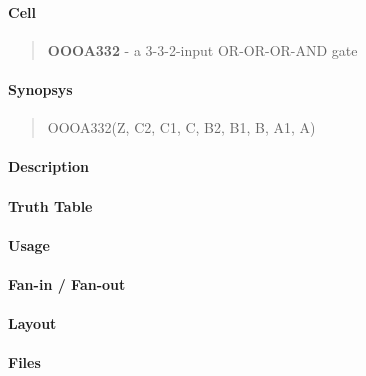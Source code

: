 \label{OOOA332}
\paragraph{Cell}
\begin{quote}
    \textbf{OOOA332} - a 3-3-2-input OR-OR-OR-AND gate
\end{quote}

\paragraph{Synopsys}
\begin{quote}
    OOOA332(Z, C2, C1, C, B2, B1, B, A1, A)
\end{quote}

\paragraph{Description}

%

\paragraph{Truth Table}
%

\paragraph{Usage}

\paragraph{Fan-in / Fan-out}

\paragraph{Layout}

\paragraph{Files}
